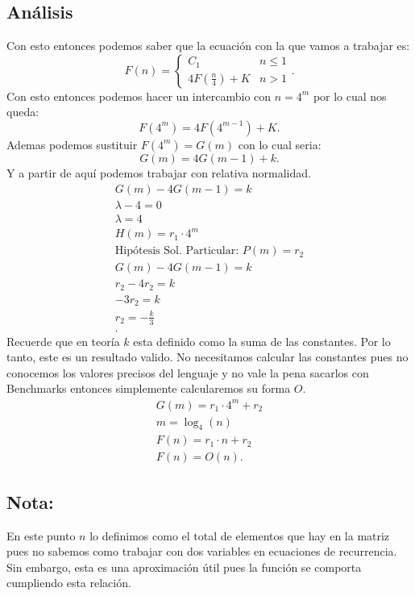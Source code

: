 \documentclass[12pt]{exam}
\begin{document}
\subsection*{Análisis}
Con esto entonces podemos saber que la ecuación con la que vamos a trabajar es: \[
  F\left( n \right) = \begin{cases}
    C_1 & n \le 1\\
    4F\left( \frac{n}{4} \right) + K & n > 1
  \end{cases}
.\] Con esto entonces podemos hacer un intercambio con $n = 4^{m}$ por lo cual nos queda: \[
F\left( 4^{m} \right) = 4F\left( 4^{m - 1} \right) + K
.\] Ademas podemos sustituir $F\left( 4^{m} \right) = G\left( m \right) $ con lo cual seria: \[
G\left( m \right) = 4G\left( m - 1 \right) + k
.\] Y a partir de aquí podemos trabajar con relativa normalidad.
\begin{align*}
  G\left( m \right) - 4G\left( m - 1 \right) = k\\
  \lambda - 4 = 0\\
  \lambda = 4\\
  H\left( m \right) = r_1\cdot 4^{m}\\
  \text{Hipótesis Sol. Particular: } P(m) = r_2\\
  G\left( m \right) - 4G\left( m - 1 \right) = k\\
  r_2 - 4r_2 = k\\
  -3 r_2 = k\\
  r_2 = -\frac{k}{3}\\
.\end{align*}
  Recuerde que en teoría $k$ esta definido como la suma de las constantes. Por lo tanto, este es un resultado valido. No necesitamos calcular las constantes pues no conocemos los valores precisos del lenguaje y no vale la pena sacarlos con Benchmarks entonces simplemente calcularemos su forma $O$.
   \begin{align*}
    G\left( m \right) = r_1\cdot 4^{m} + r_2\\
    m = \log_4\left( n \right) \\
    F\left( n \right) = r_1 \cdot n + r_2\\
    F\left( n \right) = O\left( n \right) 
  .\end{align*}

  \subsection*{Nota:}
  En este punto $n$ lo definimos como el total de elementos que hay en la matriz pues no sabemos como trabajar con dos variables en ecuaciones de recurrencia. Sin embargo, esta es una aproximación útil pues la función se comporta cumpliendo esta relación.
\end{document}
